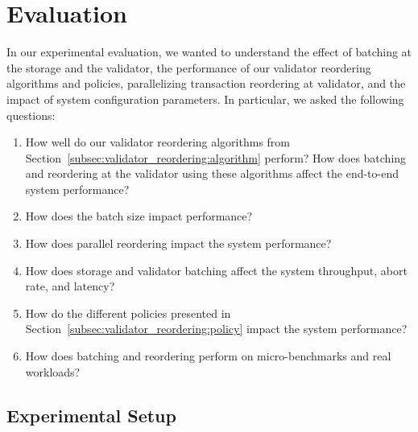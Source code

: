 \section{Evaluation}\label{sec:experiments}
In our experimental evaluation, we wanted to understand the effect of batching at the storage and the validator, the performance of our validator reordering algorithms and policies, parallelizing transaction reordering at validator, and the impact of system configuration parameters. In particular, we asked the following questions:
\begin{enumerate}
\item\vspace{-.5em} How well do our validator reordering algorithms from Section~\ref{subsec:validator_reordering:algorithm} perform? How does batching and reordering at the validator using these algorithms affect the end-to-end system performance?
\item\vspace{-.5em} How does the batch size impact performance? 
\item\vspace{-.5em} How does parallel reordering impact the system performance?
\item\vspace{-.5em} How does storage and validator batching affect the system throughput, abort rate, and latency?
\item\vspace{-.5em} How do the different policies presented in Section~\ref{subsec:validator_reordering:policy} impact the system performance?
\item\vspace{-.5em} How does batching and reordering perform on micro-benchmarks and real workloads?
\end{enumerate}

\subsection{Experimental Setup}
\label{subsec:experiment:implementation}


